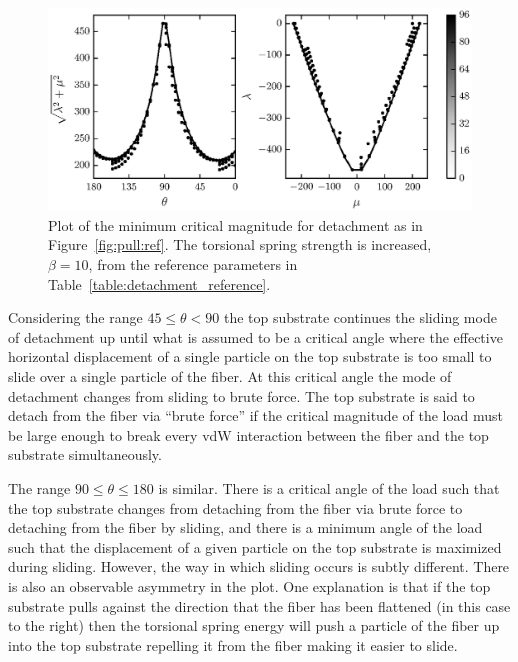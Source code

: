    \begin{figure}[t]
      \begin{center}
         \includegraphics{./fig/ch3/pull/b10/grid.eps}
      \end{center}      
      \caption{Plot of the minimum critical magnitude for detachment as in Figure~\ref{fig:pull:ref}. The torsional spring strength is increased, $\beta=10$, from the reference parameters in Table~\ref{table:detachment_reference}.
      \label{fig:pull:b10}}
   \end{figure}

Considering the range $45 \leq \theta < 90$ the top substrate continues the sliding mode of detachment up until what is assumed to be a critical angle where the effective horizontal displacement of a single particle on the top substrate is too small to slide over a single particle of the fiber. At this critical angle the mode of detachment changes from sliding to brute force. The top substrate is said to detach from the fiber via ``brute force'' if the critical magnitude of the load must be large enough to break every vdW interaction between the fiber and the top substrate simultaneously.

The range $90 \leq \theta \leq 180$ is similar. There is a critical angle of the load such that the top substrate changes from detaching from the fiber via brute force to detaching from the fiber by sliding, and there is a minimum angle of the load such that the displacement of a given particle on the top substrate is maximized during sliding. However, the way in which sliding occurs is subtly different. There is also an observable asymmetry in the plot. One explanation is that if the top substrate pulls against the direction that the fiber has been flattened (in this case to the right) then the torsional spring energy will push a particle of the fiber up into the top substrate repelling it from the fiber making it easier to slide.

